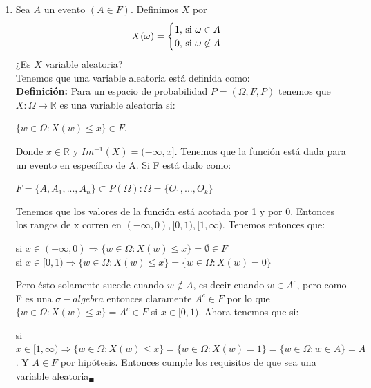 \documentclass[12pt,a4paper]{report}
\begin{document}
	\begin{enumerate}
		\item{
			Sea $A$ un evento $(A \in F)$. Definimos $X$ por
			\[
				X(\omega) =
				\begin{cases}
					1, $ si $\omega \in A\\
					0, $ si $\omega \not\in A
				\end{cases}
			\]
			¿Es $X$ variable aleatoria?\\
			
			Tenemos que una variable aleatoria está definida como: \\
			\textbf{Definición:} Para un espacio de probabilidad $P=(\Omega,F,P)$ tenemos que $X:\Omega \mapsto \mathds{R}$ es una variable aleatoria si:
        		   	\begin{center}
			   $ \lbrace w\in \Omega : X(w) \leq x \rbrace \in F.$
			\end{center}
			Donde $x\in \mathds{R}$ y $Im^{-1}(X)=(-\infty,x]$. Tenemos que la función está dada para un evento en específico de A. Si F está dado como: \\
			\begin{center}
			    $F= \lbrace A, A_{1},...,A_{n} \rbrace \subset P(\Omega): \Omega = \lbrace O_{1},...,O_{k} \rbrace $
			\end{center}
			Tenemos que los valores de la función está acotada por 1 y por 0. Entonces los rangos de x corren en $(-\infty,0),[0,1),[1,\infty)$. Tenemos entonces que:\\
		    \begin{center}
		        si $x\in (-\infty,0) \Rightarrow \lbrace w \in \Omega: X(w) \leq x \rbrace =  \emptyset  \in F $\\
		        si $x\in [0,1)  \Rightarrow \lbrace w \in \Omega: X(w) \leq x \rbrace = \lbrace w\in \Omega : X(w)=0 \rbrace$
		    \end{center}
		    Pero ésto solamente sucede cuando $w\notin A $, es decir cuando $w \in A^c$, pero como F es una $\sigma-algebra$ entonces claramente $A^c\in F$ por lo que $\lbrace w \in \Omega : X(w) \leq x \rbrace = A^c \in F$ si $x\in [0,1)$.  Ahora tenemos que si:\\
		    \begin{center}
		        si $x\in [1,\infty) \Rightarrow \lbrace w \in \Omega : X(w) \leq x \rbrace = \lbrace w \in \Omega : X(w)=1 \rbrace  = \lbrace w\in \Omega: w \in A \rbrace = A$. 
		        Y $A \in F$ por hipótesis. Entonces cumple los requisitos de que sea una variable aleatoria$_{\blacksquare}$
		    \end{center}
			
}
\end{enumerate}
\end{document}
